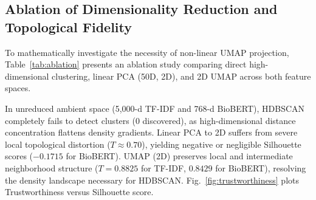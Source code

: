 \documentclass[a4paper,fleqn]{cas-dc}
\begin{document}
\subsection{Ablation of Dimensionality Reduction and Topological Fidelity}

To mathematically investigate the necessity of non-linear UMAP projection, Table~\ref{tab:ablation} presents an ablation study comparing direct high-dimensional clustering, linear PCA (50D, 2D), and 2D UMAP across both feature spaces.

\begin{table}[t]
\centering
\caption{Dimensionality reduction ablation and neighborhood trustworthiness ($T$).}
\label{tab:ablation}
\end{table}

In unreduced ambient space (5,000-d TF-IDF and 768-d BioBERT), HDBSCAN completely fails to detect clusters (0 discovered), as high-dimensional distance concentration flattens density gradients. Linear PCA to 2D suffers from severe local topological distortion ($T \approx 0.70$), yielding negative or negligible Silhouette scores ($-0.1715$ for BioBERT). UMAP (2D) preserves local and intermediate neighborhood structure ($T = 0.8825$ for TF-IDF, $0.8429$ for BioBERT), resolving the density landscape necessary for HDBSCAN. Fig.~\ref{fig:trustworthiness} plots Trustworthiness versus Silhouette score.
\end{document}
